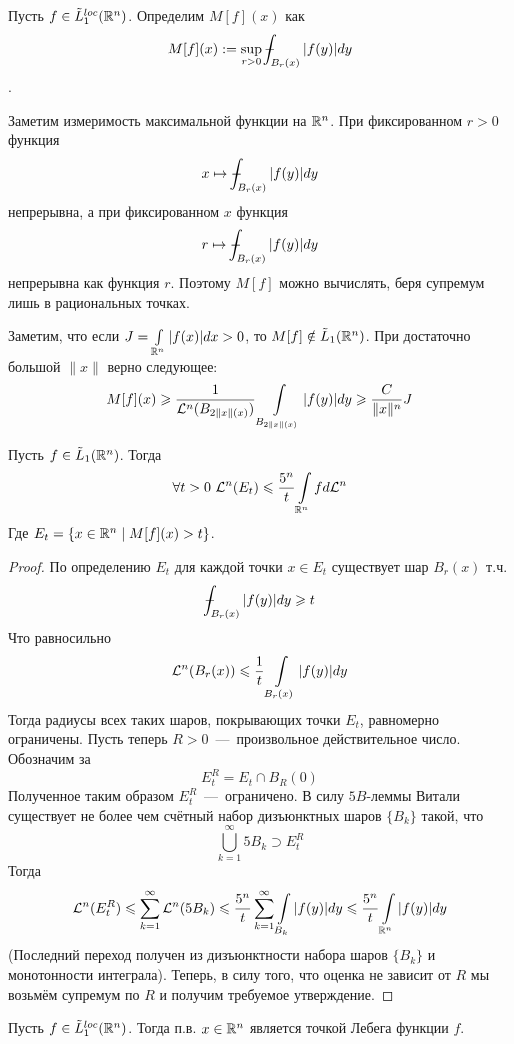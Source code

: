 \begin{definition}
    Пусть $f \in \Tilde{L}_1^{loc}(\mathbb{R}^n)$. Определим $M[f](x)$ как \[M[f](x) := \sup\limits_{r > 0}\dashint_{B_r(x)} |f(y)|dy\].
\end{definition}
\begin{note}
    Заметим измеримость максимальной функции на $\mathbb{R}^n$. При фиксированном $r > 0$ функция \[x \mapsto \dashint_{B_r(x)}|f(y)|dy\]
    непрерывна, а при фиксированном $x$ функция \[r \mapsto \dashint_{B_r(x)}|f(y)|dy\] непрерывна как функция $r$.	
    Поэтому $M[f]$ можно вычислять, беря супремум лишь в рациональных точках.
\end{note}
\begin{note}
    Заметим, что если $J = \int\limits_{\mathbb{R}^n} |f(x)|dx > 0$, то $M[f] \notin \Tilde{L}_1(\mathbb{R}^n)$. При достаточно большой $\|x\|$ верно следующее: \[M[f](x) \geqslant \dfrac{1}{\mathcal{L}^n(B_{2\|x\|(x)})}\int\limits_{B_{2\|x\|(x)}}|f(y)|dy \geqslant \dfrac{C}{\|x\|^n}J \]
\end{note}
\begin{lemma}
    Пусть $f \in \Tilde{L}_1(\mathbb{R}^n)$. Тогда \[\forall t > 0 \ 
 \LL^n(E_t) \leq \dfrac{5^n}{t}\int\limits_{\R^n}fd\LL^n\]
 Где $E_t = \{x \in \mathbb{R}^n \mid M[f](x) > t\}$.
\end{lemma}
\begin{proof}
    По определению $E_t$ для каждой точки $x \in E_t$ существует шар $B_r(x)$ т.ч. \[\dashint_{B_r(x)}|f(y)|dy \geq t\]
    Что равносильно \[\mathcal{L}^n(B_r(x)) \leqslant \dfrac{1}{t}\int\limits_{B_r(x)}|f(y)|dy\]
    Тогда радиусы всех таких шаров, покрывающих точки $E_t$, равномерно ограничены. Пусть теперь $R > 0$~---~произвольное действительное число. Обозначим за \[E_t^R = E_t \cap B_R(0)\]
    Полученное таким образом $E_t^R$~---~ограничено. В силу $5B$-леммы Витали существует не более чем счётный набор дизъюнктных шаров $\{B_k\}$ такой, что \[\bigcup\limits_{k = 1}^\infty 5B_k \supset E_t^R\]
    Тогда \[\mathcal{L}^n(E_t^R) \leqslant \sum\limits_{k = 1}^\infty \mathcal{L}^n(5B_k) \leqslant \dfrac{5^n}{t}\sum\limits_{k = 1}^\infty \int\limits_{B_k}|f(y)|dy \leqslant \dfrac{5^n}{t}\int\limits_{\mathbb{R}^n}|f(y)|dy\]
    (Последний переход получен из дизъюнктности набора шаров $\{B_k\}$ и монотонности интеграла). Теперь, в силу того, что оценка не зависит от $R$ мы возьмём супремум по $R$ и получим требуемое утверждение.
\end{proof}
\begin{theorem}
    Пусть $f \in \Tilde{L}_1^{loc}(\mathbb{R}^n)$. Тогда п.в. $x \in \mathbb{R}^n$ является точкой Лебега функции $f$.
\end{theorem}
